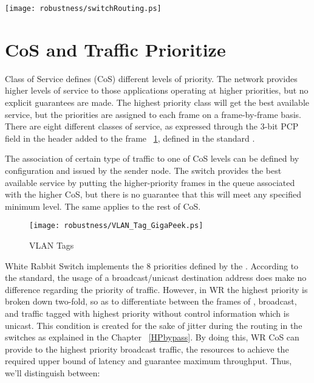 \begin{center}
	\texttt{[image: robustness/switchRouting.ps]}
	\label{fig:swRouting}
\end{center}

\section{CoS and Traffic Prioritize}
\label{chapter:cos}

Class of Service defines (CoS) different levels of priority. The network
provides higher levels of service to those applications operating at higher
priorities, but no explicit guarantees are made. The highest priority
class will get the best available service, but the priorities are assigned to
each frame on a frame-by-frame basis. There are eight different classes of
service, as expressed through the 3-bit PCP field in the header added to the
frame ~\ref{fig:VLAN_Tag}, defined in the standard \cite{IEEE8021Q}.


The association of certain type of traffic to one of CoS levels can be defined
by configuration and issued by the sender node. The switch provides the best
available service by putting the higher-priority frames in the queue associated
with the higher CoS, but there is no guarantee that this will meet any specified
minimum level. The same applies to the rest of CoS. 

\begin{figure}[!ht]
 \centering
		\texttt{[image: robustness/VLAN\_Tag\_GigaPeek.ps]}
 \caption{VLAN Tags}
	\label{fig:VLAN_Tag}
\end{figure}


White Rabbit Switch implements the 8 priorities defined by the \cite{IEEE8021Q}.
According to the standard, the usage of a broadcast/unicast destination address
does make no difference regarding the priority of traffic. However, in WR the
highest priority is broken down two-fold, so as to differentiate between the
frames of \ControlMessage, broadcast, and traffic tagged with highest priority
without control information which is unicast. This condition
is created for the sake of jitter during the routing in the
switches as explained in the Chapter ~\ref{HPbypass}. By doing this, WR CoS can
provide to the highest priority broadcast traffic, the resources to
achieve the required upper bound of latency and guarantee maximum throughput.
Thus, we'll distinguish between:

